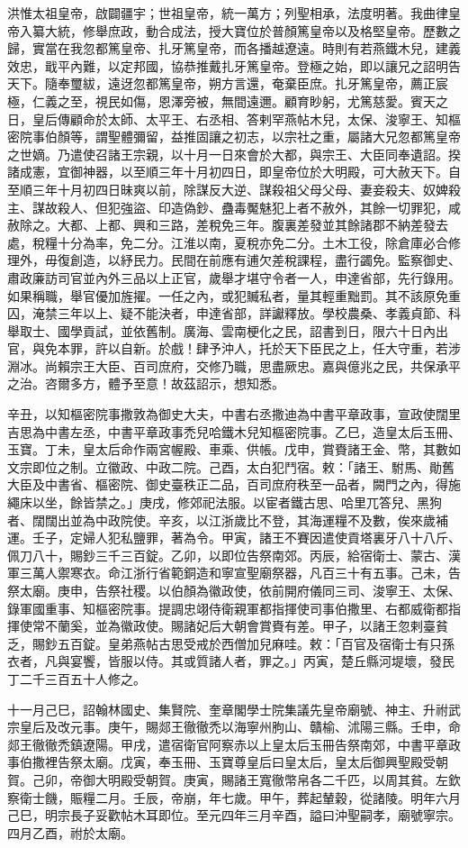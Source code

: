 \begin{pinyinscope}
 洪惟太祖皇帝，啟闢疆宇；世祖皇帝，統一萬方；列聖相承，法度明著。我曲律皇帝入纂大統，修舉庶政，動合成法，授大寶位於普顏篤皇帝以及格堅皇帝。歷數之歸，實當在我忽都篤皇帝、扎牙篤皇帝，而各播越遼遠。時則有若燕鐵木兒，建義效忠，戢平內難，以定邦國，協恭推戴扎牙篤皇帝。登極之始，即以讓兄之詔明告天下。隨奉璽紱，遠迓忽都篤皇帝，朔方言還，奄棄臣庶。扎牙篤皇帝，薦正宸極，仁義之至，視民如傷，恩澤旁被，無間遠邇。顧育眇躬，尤篤慈愛。賓天之日，皇后傳顧命於太師、太平王、右丞相、答剌罕燕帖木兒，太保、浚寧王、知樞密院事伯顏等，謂聖體彌留，益推固讓之初志，以宗社之重，屬諸大兄忽都篤皇帝之世嫡。乃遣使召諸王宗親，以十月一日來會於大都，與宗王、大臣同奉遺詔。揆諸成憲，宜御神器，以至順三年十月初四日，即皇帝位於大明殿，可大赦天下。自至順三年十月初四日昧爽以前，除謀反大逆、謀殺祖父母父母、妻妾殺夫、奴婢殺主、謀故殺人、但犯強盜、印造偽鈔、蠱毒魘魅犯上者不赦外，其餘一切罪犯，咸赦除之。大都、上都、興和三路，差稅免三年。腹裏差發並其餘諸郡不納差發去處，稅糧十分為率，免二分。江淮以南，夏稅亦免二分。土木工役，除倉庫必合修理外，毋復創造，以紓民力。民間在前應有逋欠差稅課程，盡行蠲免。監察御史、肅政廉訪司官並內外三品以上正官，歲舉才堪守令者一人，申達省部，先行錄用。如果稱職，舉官優加旌擢。一任之內，或犯贓私者，量其輕重黜罰。其不該原免重囚，淹禁三年以上、疑不能決者，申達省部，詳讞釋放。學校農桑、孝義貞節、科舉取士、國學貢試，並依舊制。廣海、雲南梗化之民，詔書到日，限六十日內出官，與免本罪，許以自新。於戲！肆予沖人，托於天下臣民之上，任大守重，若涉淵冰。尚賴宗王大臣、百司庶府，交修乃職，思盡厥忠。嘉與億兆之民，共保承平之治。咨爾多方，體予至意！故茲詔示，想知悉。



 辛丑，以知樞密院事撒敦為御史大夫，中書右丞撒迪為中書平章政事，宣政使闊里吉思為中書左丞，中書平章政事禿兒哈鐵木兒知樞密院事。乙巳，造皇太后玉冊、玉寶。丁未，皇太后命作兩宮幄殿、車乘、供帳。戊申，賞賚諸王金、幣，其數如文宗即位之制。立徽政、中政二院。己酉，太白犯鬥宿。敕：「諸王、駙馬、勛舊大臣及中書省、樞密院、御史臺秩正二品，百司庶府秩至一品者，闕門之內，得施繩床以坐，餘皆禁之。」庚戌，修郊祀法服。以宦者鐵古思、哈里兀答兒、黑狗者、闊闊出並為中政院使。辛亥，以江浙歲比不登，其海運糧不及數，俟來歲補運。壬子，定婦人犯私鹽罪，著為令。甲寅，諸王不賽因遣使貢塔裏牙八十八斤、佩刀八十，賜鈔三千三百錠。乙卯，以即位告祭南郊。丙辰，給宿衛士、蒙古、漢軍三萬人禦寒衣。命江浙行省範銅造和寧宣聖廟祭器，凡百三十有五事。己未，告祭太廟。庚申，告祭社稷。以伯顏為徽政使，依前開府儀同三司、浚寧王、太保、錄軍國重事、知樞密院事。提調忠翊侍衛親軍都指揮使司事伯撒里、右都威衛都指揮使常不蘭奚，並為徽政使。賜諸妃后大朝會賞賚有差。甲子，以諸王忽剌臺貧乏，賜鈔五百錠。皇弟燕帖古思受戒於西僧加兒麻哇。敕：「百官及宿衛士有只孫衣者，凡與宴饗，皆服以侍。其或質諸人者，罪之。」丙寅，楚丘縣河堤壞，發民丁二千三百五十人修之。



 十一月己巳，詔翰林國史、集賢院、奎章閣學士院集議先皇帝廟號、神主、升祔武宗皇后及改元事。庚午，賜郯王徹徹禿以海寧州朐山、贛榆、沭陽三縣。壬申，命郯王徹徹禿鎮遼陽。甲戌，遣宿衛官阿察赤以上皇太后玉冊告祭南郊，中書平章政事伯撒裡告祭太廟。戊寅，奉玉冊、玉寶尊皇后曰皇太后，皇太后御興聖殿受朝賀。己卯，帝御大明殿受朝賀。庚寅，賜諸王寬徹幣帛各二千匹，以周其貧。左欽察衛士饑，賑糧二月。壬辰，帝崩，年七歲。甲午，葬起輦穀，從諸陵。明年六月己巳，明宗長子妥歡帖木耳即位。至元四年三月辛酉，謚曰沖聖嗣孝，廟號寧宗。四月乙酉，祔於太廟。



\end{pinyinscope}